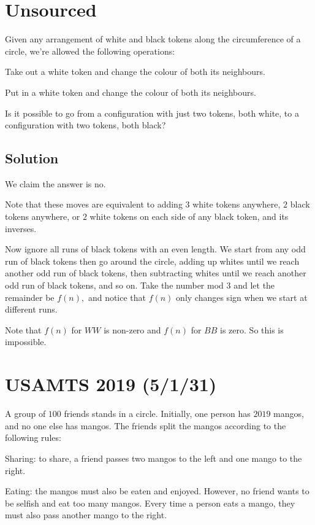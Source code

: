 \documentclass[blue,onecol]{shooting}
\begin{document}
\section{Unsourced}

Given any arrangement of white and black tokens along the circumference of a circle, we're allowed the following operations:
    \begin{itemize}
        \Item Take out a white token and change the colour of both its neighbours.
        
        \Item Put in a white token and change the colour of both its neighbours.
    \end{itemize}
    Is it possible to go from a configuration with just two tokens, both white, to a configuration with two tokens, both black?

\subsection{Solution}

We claim the answer is no.

Note that these moves are equivalent to adding $3$ white tokens anywhere, $2$ black tokens anywhere, or $2$ white tokens on each side of any black token, and its inverses.

Now ignore all runs of black tokens with an even length. We start from any odd run of black tokens then go around the circle, adding up whites until we reach another odd run of black tokens, then subtracting whites until we reach another odd run of black tokens, and so on. Take the number mod $3$ and let the remainder be $f(n),$ and notice that $f(n)$ only changes sign when we start at different runs.

Note that $f(n)$ for $WW$ is non-zero and $f(n)$ for $BB$ is zero. So this is impossible.

\section{USAMTS 2019 (5/1/31)}

A group of $100$ friends stands in a circle. Initially, one person has $2019$ mangos, and
no one else has mangos. The friends split the mangos according to the following rules:

\begin{itemize}
     \Item Sharing: to share, a friend passes two mangos to the left and one mango to the right.

     \Item Eating: the mangos must also be eaten and enjoyed. However, no friend wants to be
selfish and eat too many mangos. Every time a person eats a mango, they must also
pass another mango to the right.
\end{itemize}
\end{document}
